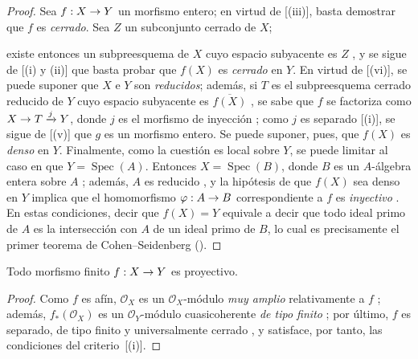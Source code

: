 \documentclass[oneside,10pt]{amsart}
\makeatletter
\newcommand{\ega@arrow}[2]{\mathchoice{#1}{#2}{#2}{#2}}
\renewcommand{\to}{\ega@arrow{\longrightarrow}{\rightarrow}}
\newcommand{\oldpage}[2][]{\marginnote{\normalfont\footnotesize\textbf{#1}~|~#2}\ignorespaces}
\let\EGAOriginalLabel\label
\renewcommand{\label}[1]{\phantomsection\EGAOriginalLabel{#1}}
\makeatother
\begin{document}
\begin{proof}
Sea $f:X\to Y$ un morfismo entero;
en virtud de [(iii)], basta demostrar que $f$ es \emph{cerrado}.
Sea $Z$ un subconjunto cerrado de $X$;


existe entonces un subpreesquema de $X$ 
\oldpage[II]{113}
cuyo espacio subyacente es $Z$ , y se sigue de [(i) y (ii)] que basta probar que $f(X)$ es \emph{cerrado} en $Y$.
En virtud de [(vi)], se puede suponer que $X$ e $Y$ son \emph{reducidos};
además, si $T$ es el subpreesquema cerrado reducido de $Y$ cuyo espacio subyacente es $\overline{f(X)}$ , se sabe que $f$ se factoriza como $X\to T\xrightarrow{j}Y$, donde $j$ es el morfismo de inyección ; como $j$ es separado [(i)], se sigue de [(v)] que $g$ es un morfismo entero.
Se puede suponer, pues, que $f(X)$ es \emph{denso} en $Y$.
Finalmente, como la cuestión es local sobre $Y$, se puede limitar al caso en que $Y=\operatorname{Spec}(A)$.
Entonces $X=\operatorname{Spec}(B)$, donde $B$ es un $A$-álgebra entera sobre $A$ ;
además, $A$ es reducido , y la hipótesis de que $f(X)$ sea denso en $Y$ implica que el homomorfismo $\varphi:A\to B$ correspondiente a $f$ es \emph{inyectivo} .
En estas condiciones, decir que $f(X)=Y$ equivale a decir que todo ideal primo de $A$ es la intersección con $A$ de un ideal primo de $B$, lo cual es precisamente el primer teorema de Cohen--Seidenberg (\cite[t.~I, p.~257, th.~3]{I-13}).
\end{proof}

\begin{corollary}[6.1.11]
\label{II.6.1.11-fr}
Todo morfismo finito $f:X\to Y$ es proyectivo.
\end{corollary}

\begin{proof}
Como $f$ es afín, $\mathcal{O}_X$ es un $\mathcal{O}_X$-módulo \emph{muy amplio} relativamente a $f$ ;
además, $f_*(\mathcal{O}_X)$ es un $\mathcal{O}_Y$-módulo cuasicoherente \emph{de tipo finito} ;
por último, $f$ es separado, de tipo finito y universalmente cerrado , y satisface, por tanto, las condiciones del criterio~[(i)].
\end{proof}
\end{document}
